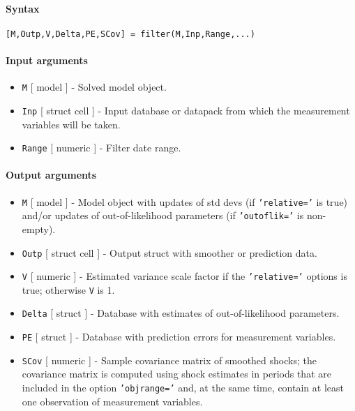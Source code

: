 


	\paragraph{Syntax}

\begin{verbatim}
[M,Outp,V,Delta,PE,SCov] = filter(M,Inp,Range,...)
\end{verbatim}

\paragraph{Input arguments}

\begin{itemize}
\item
  \texttt{M} {[} model {]} - Solved model object.
\item
  \texttt{Inp} {[} struct \textbar{} cell {]} - Input database or
  datapack from which the measurement variables will be taken.
\item
  \texttt{Range} {[} numeric {]} - Filter date range.
\end{itemize}

\paragraph{Output arguments}

\begin{itemize}
\item
  \texttt{M} {[} model {]} - Model object with updates of std devs (if
  \texttt{'relative='} is true) and/or updates of out-of-likelihood
  parameters (if \texttt{'outoflik='} is non-empty).
\item
  \texttt{Outp} {[} struct \textbar{} cell {]} - Output struct with
  smoother or prediction data.
\item
  \texttt{V} {[} numeric {]} - Estimated variance scale factor if the
  \texttt{'relative='} options is true; otherwise \texttt{V} is 1.
\item
  \texttt{Delta} {[} struct {]} - Database with estimates of
  out-of-likelihood parameters.
\item
  \texttt{PE} {[} struct {]} - Database with prediction errors for
  measurement variables.
\item
  \texttt{SCov} {[} numeric {]} - Sample covariance matrix of smoothed
  shocks; the covariance matrix is computed using shock estimates in
  periods that are included in the option \texttt{'objrange='} and, at
  the same time, contain at least one observation of measurement
  variables.
\end{itemize}

